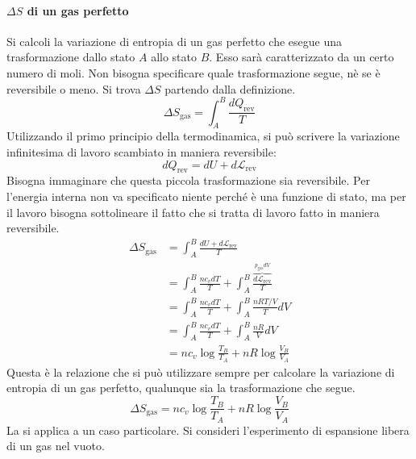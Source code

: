 \documentclass[10pt,a4paper]{book}
\begin{document}
\paragraph{ $\Delta S$ di un gas perfetto} Si calcoli la variazione di entropia di un gas perfetto che esegue una trasformazione dallo stato $A$ allo stato $B$. Esso sarà caratterizzato da un certo numero di moli. Non bisogna specificare quale trasformazione segue, nè se è reversibile o meno. Si trova $\Delta S$ partendo dalla definizione.
\[
	\Delta S_{\text{gas} } = \int_A^B \frac{dQ_{\text{rev} } }{T}
\]
Utilizzando il primo principio della termodinamica, si può scrivere la variazione infinitesima di lavoro scambiato in maniera reversibile:
\[
	dQ_{\text{rev} } = dU + d\mathcal{L}_{\text{rev} }
\]
Bisogna immaginare che questa piccola trasformazione sia reversibile. Per l'energia interna non va specificato niente perché è una funzione di stato, ma per il lavoro bisogna sottolineare il fatto che si tratta di lavoro fatto in maniera reversibile.
\begin{equation*}
	\begin{aligned}
		\Delta S_{\text{gas} } &= \int_A^B \frac{dU + d\mathcal{L}_{\text{rev} } }{T} \\
		&= \int_A^B \frac{nc_v dT }{T} + \int_A^B \frac{\overbrace{d\mathcal{L}_{\text{rev} }}^{p_{\text{gas}}dV } }{T} \\
		&= \int_A^B \frac{nc_v dT }{T} + \int_A^B \frac{nRT/V}{T}dV \\
		&= \int_A^B \frac{nc_v dT }{T} + \int_A^B \frac{nR}{V}dV \\
		&=nc_v\log \frac{T_B }{T_A } + nR\log \frac{V_B }{V_A }
	\end{aligned}
\end{equation*}
Questa è la relazione che si può utilizzare sempre per calcolare la variazione di entropia di un gas perfetto, qualunque sia la trasformazione che segue.
\[
	\boxed{\Delta S_{\text{gas} } = nc_v\log \frac{T_B }{T_A } + nR\log \frac{V_B }{V_A }}
\]
La si applica a un caso particolare. Si consideri l'esperimento di espansione libera di un gas nel vuoto.
\end{document}
